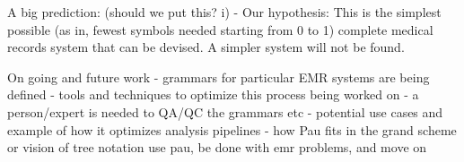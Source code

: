 \documentclass[journal]{IEEEtran}
\begin{document}
A big prediction: (should we put this? i)
 - Our hypothesis: This is the simplest possible (as in, fewest symbols needed starting from 0 to 1) complete medical records system that can be devised. A simpler system will not be found.

On going and future work
	- grammars for particular EMR systems are being defined
		- tools and techniques to optimize this process being worked on
		- a person/expert is needed to QA/QC the grammars etc
	- potential use cases and example of how it optimizes analysis pipelines
	- how Pau fits in the grand scheme or vision of tree notation
	use pau, be done with emr problems, and move on
\fi










%
\end{document}
